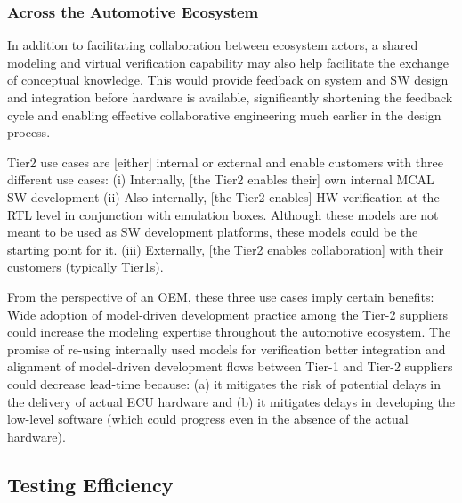 \subsubsection{Across the Automotive Ecosystem}
In addition to facilitating collaboration between ecosystem actors, a shared modeling and virtual verification capability may also help facilitate the exchange of conceptual knowledge. This would provide feedback on system and SW design and integration before hardware is available, significantly shortening the feedback cycle and enabling effective collaborative engineering much earlier in the design process.

Tier2 use cases are [either] internal or external and enable customers with three different use cases: (i) Internally, [the Tier2 enables their] own internal MCAL SW development (ii) Also internally, [the Tier2 enables] HW verification at the RTL level in conjunction with emulation boxes. Although these models are not meant to be used as SW development platforms, these models could be the starting point for it. (iii) Externally, [the Tier2 enables collaboration] with their customers (typically Tier1s).

From the perspective of an OEM, these three use cases imply certain benefits: Wide adoption of model-driven development practice among the Tier-2 suppliers could increase the modeling expertise throughout the automotive ecosystem. The promise of re-using internally used models for verification better integration and alignment of model-driven development flows between Tier-1 and Tier-2 suppliers could decrease lead-time because: (a) it mitigates the risk of potential delays in the delivery of actual ECU hardware and (b) it mitigates delays in developing the low-level software (which could progress even in the absence of the actual hardware).

\subsection{Testing Efficiency}
